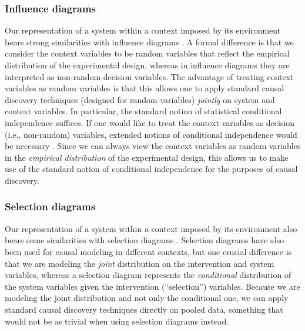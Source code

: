\documentclass[twoside,11pt]{article}
\begin{document}
\subsubsection{Influence diagrams}

Our representation of a system within a context imposed by its environment bears strong similarities with influence diagrams \citep{Dawid2002}. 
A formal difference is that we consider the context variables to be random variables that reflect the empirical distribution of the experimental design, whereas in influence diagrams they are interpreted as non-random decision variables. 
The advantage of treating context variables as random variables is that this allows one to apply standard causal discovery techniques (designed for random variables) \emph{jointly} on system and context variables. 
In particular, the standard notion of statistical conditional independence \citep{Dawid1979} suffices. 
If one would like to treat the context variables as decision (i.e., non-random) variables, extended notions of conditional independence would be necessary \citep{ForreMooij_UAI_19}. 
Since we can always view the context variables as random variables in the \emph{empirical distribution} of the experimental design, this allows us to make use of the standard notion of conditional independence for the purposes of causal discovery.

\subsubsection{Selection diagrams}
Our representation of a system within a context imposed by its environment also bears some similarities with selection diagrams \citep{BareinboimPearl2013}.
Selection diagrams have also been used for causal modeling in different contexts, but one crucial difference is that we are modeling the \emph{joint} distribution on the intervention and system variables, whereas a selection diagram represents the \emph{conditional} distribution of the system variables given the intervention (``selection'') variables. 
Because we are modeling the joint distribution and not only the conditional one, we can apply standard causal discovery techniques directly on pooled data, something that would not be as trivial when using selection diagrams instead.
\end{document}

